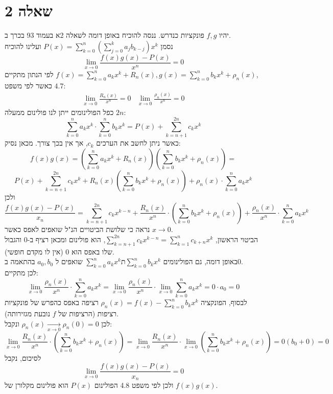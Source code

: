 \documentclass{article}
\begin{document}
\section*{שאלה 2}

יהיו $f,g$ פונקציות כנדרש. ננסה להוכיח באופן דומה לשאלה 2א בעמוד 93 בכרך ב. \\
נסמן $P(x)=\sum_{k=0}^{n}(\sum_{j=0}^ka_jb_{k-j})x^k$
ועלינו להוכיח
\[
    \lim_{x\rightarrow 0} \frac{f(x)g(x)-P(x)}{x^n}=0
\]
לפי הנתון מתקיים $f(x)=\sum_{k=0}^na_kx^k + R_n(x), g(x)=\sum_{k=0}^nb_kx^k+\rho_n(x)$, \\
כאשר לפי משפט $4.7$:
\[
    \begin{matrix}
        \lim_{x\rightarrow 0}\frac{R_n(x)}{x^n} = 0 &
        \lim_{x\rightarrow 0}\frac{\rho_n(x)}{x^n} = 0
    \end{matrix}
\]
כפל הפולינומים ייתן לנו פולינום ממעלה $2n$:
\[
    \sum_{k=0}^na_kx^k \cdot \sum_{k=0}^nb_kx^k =
    P(x) + \sum_{k=n+1}^{2n} c_kx^k
\]
כאשר ניתן לחשב את הערכים $c_k$, אך אין בכך צורך. מכאן נסיק:
\[
    f(x)g(x) = (\sum_{k=0}^na_kx^k + R_n(x))(\sum_{k=0}^nb_kx^k+\rho_n(x)) =
\]
\[
    P(x) + \sum_{k=n+1}^{2n} c_kx^k + R_n(x)(\sum_{k=0}^nb_kx^k+\rho_n(x)) + \rho_n(x) \cdot \sum_{k=0}^na_kx^k
\]
ולכן
\[
    \frac{f(x)g(x)-P(x)}{x_n} =
    \sum_{k=n+1}^{2n} c_kx^{k-n} + \frac{R_n(x)}{x^n}\cdot(\sum_{k=0}^nb_kx^k+\rho_n(x)) + \frac{\rho_n(x)}{x^n}\cdot \sum_{k=0}^na_kx^k
\]
נראה כי שלושת הביטויים הנ"ל שואפים לאפס כאשר $x\rightarrow 0$. \\
הביטוי הראשון, $\sum_{k=n+1}^{2n} c_kx^{k-n}=\sum_{k=1}^{n} c_{k+n}x^k$,
הוא פולינום ומכאן רציף ב-0 והגבול שלו באפס הוא $0$ (אין לו מקדם חופשי). \\
באופן דומה, גם הפולינומים $\sum_{k=0}^na_kx^kת \sum_{k=0}^nb_kx^k$ שואפים ל $a_0, b_0$ בהתאמה ב$0$. \\
לכן מתקיים:
\[
    \lim_{x\rightarrow 0} \frac{\rho_n(x)}{x^n}\cdot \sum_{k=0}^na_kx^k =
    \lim_{x\rightarrow 0} \frac{\rho_n(x)}{x^n}\cdot \lim_{x\rightarrow 0}\sum_{k=0}^na_kx^k =
    0 \cdot a_0 = 0
\]
לבסוף, הפונקציה $\rho_n(x)=f(x)-\sum_{k=0}^nb_kx^k$
רציפה באפס כהפרש של פונקציות רציפות (הרציפות של $f$ נובעת מגזירותה). \\
לכן $\rho_n(x)\xrightarrow[x\rightarrow 0]{}\rho_n(0)=0$ ונקבל:
\[
    \lim_{x\rightarrow 0} \frac{R_n(x)}{x^n}\cdot(\sum_{k=0}^nb_kx^k+\rho_n(x)) =
    \lim_{x\rightarrow 0} \frac{R_n(x)}{x^n}\cdot \lim_{x\rightarrow 0}(\sum_{k=0}^nb_kx^k+\rho_n(x)) =
    0 (b_0+0)=0
\]
לסיכום, נקבל
\[
    \lim_{x\rightarrow 0}\frac{f(x)g(x)-P(x)}{x_n}=0
\]
ולכן לפי משפט 4.8 הפולינום $P(x)$
הוא פולינום מקלורן של $f(x)g(x)$.
\end{document}
